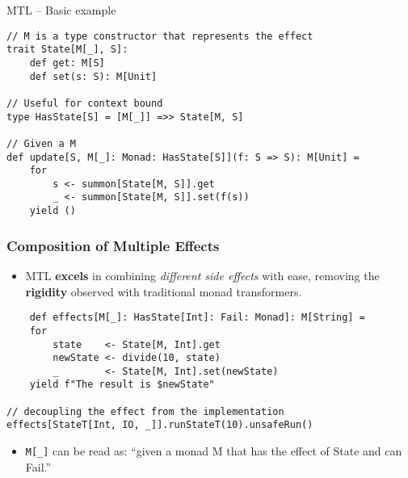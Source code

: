 \documentclass[presentation, 10pt]{beamer}\mode<presentation>{\usetheme{metropolis}}
\begin{document}
\begin{frame}[fragile]{MTL -- Basic example}
\begin{tcolorbox}
\begin{verbatim}
// M is a type constructor that represents the effect
trait State[M[_], S]:
	def get: M[S]
	def set(s: S): M[Unit]

// Useful for context bound
type HasState[S] = [M[_]] =>> State[M, S]

// Given a M 
def update[S, M[_]: Monad: HasState[S]](f: S => S): M[Unit] =
	for
		s <- summon[State[M, S]].get
		_ <- summon[State[M, S]].set(f(s))
	yield ()
\end{verbatim}
\end{tcolorbox}
\end{frame}
\begin{frame}[fragile]
	\frametitle{Composition of Multiple Effects}
	
	\begin{itemize}
			\item MTL \textbf{excels} in combining \emph{different side effects} with ease, removing the \textbf{rigidity} observed with traditional monad transformers.
	\end{itemize}
\begin{tcolorbox}
	
\begin{verbatim}
	def effects[M[_]: HasState[Int]: Fail: Monad]: M[String] =
	for
		state    <- State[M, Int].get
		newState <- divide(10, state)
		_        <- State[M, Int].set(newState)
	yield f"The result is $newState"

// decoupling the effect from the implementation
effects[StateT[Int, IO, _]].runStateT(10).unsafeRun()
\end{verbatim}
\end{tcolorbox}

\begin{itemize}
	\item \texttt{M[_]} can be read as: ``given a monad M that has the effect of State and can Fail.''
\end{itemize}	
\end{frame}
\end{document}
